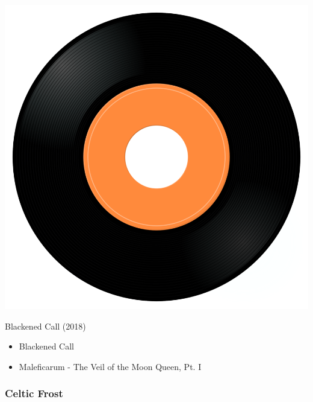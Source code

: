 \begin{minipage}[t]{0.25\textwidth}\vspace{0pt}
\captionsetup{type=figure}
\includegraphics[width=\textwidth]{Images/cover.png}
\caption*{Blackened Call (2018)}
\end{minipage}
\begin{minipage}[t]{0.25\textwidth}\vspace{0pt}
\begin{itemize}[nosep,leftmargin=1em,labelwidth=*,align=left]
	\setlength{\itemsep}{0pt}
	\item Blackened Call
	\item	Maleficarum - The Veil of the Moon Queen, Pt. I
\end{itemize}
\end{minipage}

\subsubsection{Celtic Frost}

